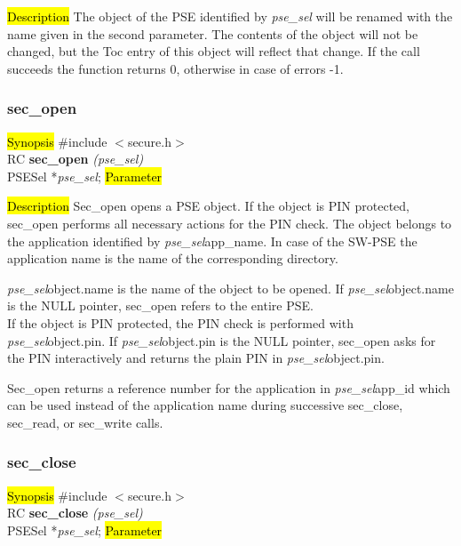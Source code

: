 
\hl{Description}
The object of the PSE identified by {\em pse\_sel} will be renamed
with the name given in the second parameter. The contents of the
object will not be changed, but the Toc entry of this object
will reflect that change. If the call succeeds the function
returns 0, otherwise in case of errors -1.

\subsubsection{sec\_open}
\label{sec_open}
\hl{Synopsis}
\#include $<$secure.h$>$ \\ [0.5cm]
RC {\bf sec\_open} {\em (pse\_sel)} \\
PSESel *{\em pse\_sel};
\hl{Parameter}

\hl{Description}
Sec\_open opens a PSE object. If the object is PIN protected, sec\_open performs
all necessary actions for the PIN check.
The object belongs to the application identified by {\em pse\_sel}\pf app\_name.
In case of the SW-PSE the application name is the name of the corresponding directory. 

{\em pse\_sel}\pf object.name is the name of the object to be opened. If {\em pse\_sel}\pf object.name
is the NULL pointer, sec\_open refers to the entire PSE. \\
If the object is PIN protected, the PIN check is performed with {\em pse\_sel}\pf object.pin.
If {\em pse\_sel}\pf object.pin is the NULL pointer, sec\_open asks for the PIN
interactively and returns the plain PIN in {\em pse\_sel}\pf object.pin. 

Sec\_open returns a reference number for the application in {\em pse\_sel}\pf app\_id which
can be used instead of the application name during successive sec\_close, sec\_read, 
or sec\_write calls.

\subsubsection{sec\_close}
\label{sec_close}
\hl{Synopsis}
\#include $<$secure.h$>$ \\ [0.5cm]
RC {\bf sec\_close} {\em (pse\_sel)} \\
PSESel *{\em pse\_sel};
\hl{Parameter}

